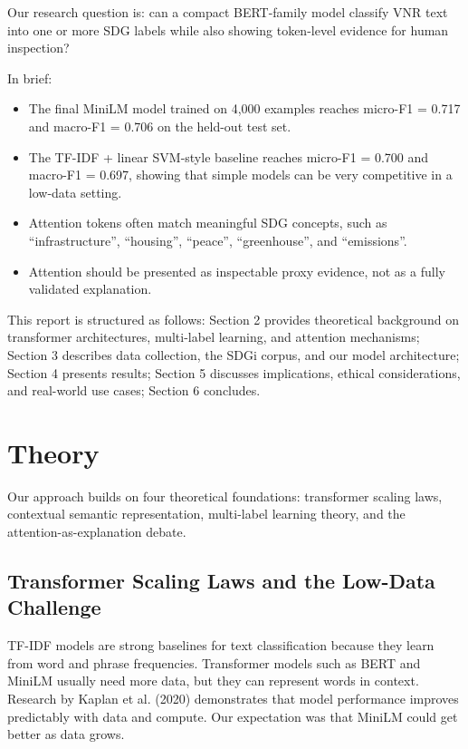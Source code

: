 \documentclass[12pt,a4paper]{article}
\begin{document}
Our research question is: can a compact BERT-family model classify VNR text into one or more SDG labels while also showing token-level evidence for human inspection?

In brief:

\begin{itemize}
\item The final MiniLM model trained on 4,000 examples reaches micro-F1 = 0.717 and macro-F1 = 0.706 on the held-out test set.
\item The TF-IDF + linear SVM-style baseline reaches micro-F1 = 0.700 and macro-F1 = 0.697, showing that simple models can be very competitive in a low-data setting.
\item Attention tokens often match meaningful SDG concepts, such as ``infrastructure'', ``housing'', ``peace'', ``greenhouse'', and ``emissions''.
\item Attention should be presented as inspectable proxy evidence, not as a fully validated explanation.
\end{itemize}

This report is structured as follows: Section 2 provides theoretical background on transformer architectures, multi-label learning, and attention mechanisms; Section 3 describes data collection, the SDGi corpus, and our model architecture; Section 4 presents results; Section 5 discusses implications, ethical considerations, and real-world use cases; Section 6 concludes.

\section{Theory}

Our approach builds on four theoretical foundations: transformer scaling laws, contextual semantic representation, multi-label learning theory, and the attention-as-explanation debate.

\subsection{Transformer Scaling Laws and the Low-Data Challenge}\label{sec:scaling}

TF-IDF models are strong baselines for text classification because they learn from word and phrase frequencies. Transformer models such as BERT and MiniLM usually need more data, but they can represent words in context. Research by Kaplan et al. (2020) demonstrates that model performance improves predictably with data and compute. Our expectation was that MiniLM could get better as data grows.
\end{document}
